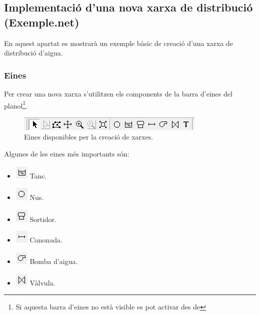 \documentclass[12pt]{article}
\begin{document}
\clearpage
\subsection{Implementació d'una nova xarxa de distribució (Exemple.net)\label{xarxaEPANET}}
En aquest apartat es mostrarà un exemple bàsic de creació d'una xarxa de distribució d'aigua.
\subsubsection{Eines}
Per crear una nova xarxa s'utilitzen els components de la barra d'eines del planol\footnote{Si aquesta barra d'eines no està visible es pot activar des de }.
\begin{figure}[h!]
	\centering
	\includegraphics[scale=1]{imatges/epanet/4.png}
	\caption{Eines disponibles per la creació de xarxes.}
\end{figure}
Algunes de les eines més importants són:
\begin{itemize}
	\item[] \includegraphics{imatges/epanet/4_1.png} Tanc.
	\item[] \includegraphics{imatges/epanet/4_2.png} Nus.
	\item[] \includegraphics{imatges/epanet/4_3.png} Sortidor.
	\item[] \includegraphics{imatges/epanet/4_4.png} Canonada.
	\item[] \includegraphics{imatges/epanet/4_5.png} Bomba d'aigua.
	\item[] \includegraphics{imatges/epanet/4_6.png} Vàlvula.
\end{itemize}
\end{document}
